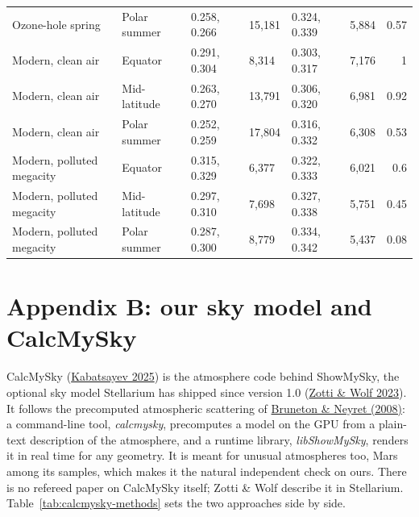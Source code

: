 \documentclass[9pt,twocolumn]{extarticle}
\begin{document}
\begin{longtable}{@{}llllllr@{}}
Ozone-hole spring & Polar summer & 0.258, 0.266 & 15,181 & 0.324, 0.339 & 5,884 & 0.57 \\
Modern, clean air & Equator & 0.291, 0.304 & 8,314 & 0.303, 0.317 & 7,176 & 1 \\
Modern, clean air & Mid-latitude & 0.263, 0.270 & 13,791 & 0.306, 0.320 & 6,981 & 0.92 \\
Modern, clean air & Polar summer & 0.252, 0.259 & 17,804 & 0.316, 0.332 & 6,308 & 0.53 \\
Modern, polluted megacity & Equator & 0.315, 0.329 & 6,377 & 0.322, 0.333 & 6,021 & 0.6 \\
Modern, polluted megacity & Mid-latitude & 0.297, 0.310 & 7,698 & 0.327, 0.338 & 5,751 & 0.45 \\
Modern, polluted megacity & Polar summer & 0.287, 0.300 & 8,779 & 0.334, 0.342 & 5,437 & 0.08 \\
\bottomrule
\end{longtable}

\clearpage
\normalsize
\section*{Appendix B: our sky model and CalcMySky}\label{app:calcmysky}

CalcMySky (\protect\hyperlink{cite.kabatsayev2025}{Kabatsayev 2025}) is the atmosphere code behind ShowMySky, the optional sky model Stellarium has shipped since version 1.0 (\protect\hyperlink{cite.zotti2023}{Zotti \& Wolf 2023}). It follows the precomputed atmospheric scattering of \protect\hyperlink{cite.bruneton2008}{Bruneton \& Neyret (2008)}: a command-line tool, \emph{calcmysky}, precomputes a model on the GPU from a plain-text description of the atmosphere, and a runtime library, \emph{libShowMySky}, renders it in real time for any geometry. It is meant for unusual atmospheres too, Mars among its samples, which makes it the natural independent check on ours. There is no refereed paper on CalcMySky itself; Zotti \& Wolf describe it in Stellarium. Table~\ref{tab:calcmysky-methods} sets the two approaches side by side.
\end{document}
